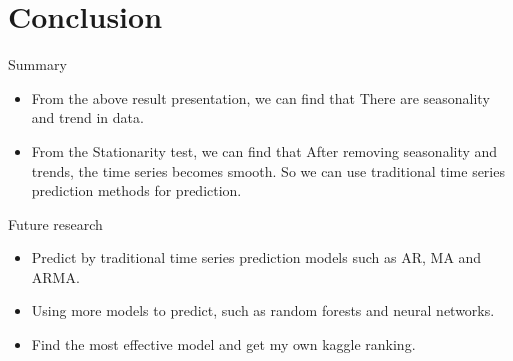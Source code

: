 \documentclass[
 size=12pt,
 paper=smartboard, %
 mode=present, %
 display=slides, %
 style=tuliplab,  %
 pauseslide,
 fleqn,leqno,clock]{powerdot}
\begin{document}
\section{Conclusion}
\begin{slide}{Summary}
  \begin{itemize}
    \item From the above result presentation, we can find that
          \subitem There are seasonality and trend in data.
          \bigskip
    \item From the Stationarity test, we can find that
          \subitem After removing seasonality and trends, the time series becomes smooth.
          \smallskip
          \subitem So we can use traditional time series prediction methods for prediction.
  \end{itemize}
\end{slide}

\begin{slide}{Future research}
  \begin{itemize}
    \item Predict by traditional time series prediction models such as AR, MA and ARMA.
    \item Using more models to predict, such as random forests and neural networks.
    \item Find the most effective model and get my own kaggle ranking.
  \end{itemize}
\end{slide}

\begin{wideslide}[toc=,bm=]{}
  \centering
  \twocolumn[
    lcolwidth=0.35\linewidth,
    rcolwidth=0.65\linewidth
  ]
  {
  }
  {


    \textcolor{black}{\scalebox{2.0}{Thank you \& Question}}


  }
\end{wideslide}
\end{document}

